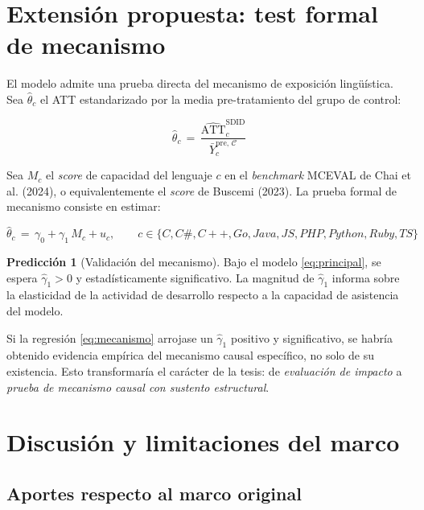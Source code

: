 \documentclass[11pt,a4paper]{article}
\theoremstyle{definition}
\newtheorem*{prediccion}{Predicción}
\begin{document}
\section{Extensión propuesta: test formal de mecanismo}

El modelo admite una prueba directa del mecanismo de exposición lingüística. Sea $\hat{\theta}_c$ el ATT estandarizado por la media pre-tratamiento del grupo de control:

\begin{equation}
\hat{\theta}_c \,=\, \frac{\widehat{\text{ATT}}_c^{\text{SDID}}}{\bar{Y}_c^{\text{pre},\,\mathcal{C}}}
\label{eq:theta_hat}
\end{equation}

Sea $M_c$ el \textit{score} de capacidad del lenguaje $c$ en el \textit{benchmark} MCEVAL de Chai et al. (2024), o equivalentemente el \textit{score} de Buscemi (2023). La prueba formal de mecanismo consiste en estimar:

\begin{equation}
\hat{\theta}_c \,=\, \gamma_0 + \gamma_1\,M_c + u_c, \qquad c \in \{C, C\#, C++, Go, Java, JS, PHP, Python, Ruby, TS\}
\label{eq:mecanismo}
\end{equation}

\begin{prediccion}[Validación del mecanismo]
Bajo el modelo \eqref{eq:principal}, se espera $\hat{\gamma}_1 > 0$ y estadísticamente significativo. La magnitud de $\hat{\gamma}_1$ informa sobre la elasticidad de la actividad de desarrollo respecto a la capacidad de asistencia del modelo.
\end{prediccion}

Si la regresión \eqref{eq:mecanismo} arrojase un $\hat{\gamma}_1$ positivo y significativo, se habría obtenido evidencia empírica del mecanismo causal específico, no solo de su existencia. Esto transformaría el carácter de la tesis: de \textit{evaluación de impacto} a \textit{prueba de mecanismo causal con sustento estructural}.

\section{Discusión y limitaciones del marco}

\subsection{Aportes respecto al marco original}
\end{document}
